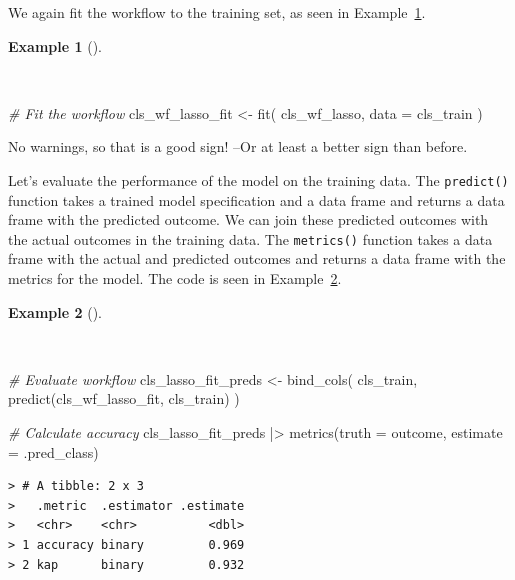 \documentclass[
  letterpaper,
  DIV=11,
  numbers=noendperiod]{scrreprt}
\newenvironment{Shaded}{\begin{snugshade}}{\end{snugshade}}
\newcommand{\AttributeTok}[1]{\textcolor[rgb]{0.00,0.00,0.00}{#1}}
\newcommand{\CommentTok}[1]{\textcolor[rgb]{0.00,0.00,0.00}{\textit{#1}}}
\newcommand{\FunctionTok}[1]{\textcolor[rgb]{0.00,0.00,0.00}{#1}}
\newcommand{\NormalTok}[1]{\textcolor[rgb]{0.00,0.00,0.00}{#1}}
\newcommand{\OtherTok}[1]{\textcolor[rgb]{0.00,0.00,0.00}{#1}}
\newcommand{\SpecialCharTok}[1]{\textcolor[rgb]{0.00,0.00,0.00}{#1}}
\theoremstyle{definition}
\newtheorem{example}{Example}[chapter]
\theoremstyle{remark}
\begin{document}
We again fit the workflow to the training set, as seen in
Example~\ref{exm-pda-class-tune-hyperparameters-fit}.

\begin{example}[]\protect\hypertarget{exm-pda-class-tune-hyperparameters-fit}{}\label{exm-pda-class-tune-hyperparameters-fit}

~

\begin{Shaded}
\begin{Highlighting}[]
\CommentTok{\# Fit the workflow}
\NormalTok{cls\_wf\_lasso\_fit }\OtherTok{\textless{}{-}}
  \FunctionTok{fit}\NormalTok{(}
\NormalTok{    cls\_wf\_lasso,}
    \AttributeTok{data =}\NormalTok{ cls\_train}
\NormalTok{    )}
\end{Highlighting}
\end{Shaded}

\end{example}

No warnings, so that is a good sign! --Or at least a better sign than
before.

Let's evaluate the performance of the model on the training data. The
\texttt{predict()} function takes a trained model specification and a
data frame and returns a data frame with the predicted outcome. We can
join these predicted outcomes with the actual outcomes in the training
data. The \texttt{metrics()} function takes a data frame with the actual
and predicted outcomes and returns a data frame with the metrics for the
model. The code is seen in
Example~\ref{exm-pda-class-tune-hyperparameters-evaluate}.

\begin{example}[]\protect\hypertarget{exm-pda-class-tune-hyperparameters-evaluate}{}\label{exm-pda-class-tune-hyperparameters-evaluate}

~

\begin{Shaded}
\begin{Highlighting}[]
\CommentTok{\# Evaluate workflow}
\NormalTok{cls\_lasso\_fit\_preds }\OtherTok{\textless{}{-}}
  \FunctionTok{bind\_cols}\NormalTok{(}
\NormalTok{    cls\_train,}
    \FunctionTok{predict}\NormalTok{(cls\_wf\_lasso\_fit, cls\_train)}
\NormalTok{  )}

\CommentTok{\# Calculate accuracy}
\NormalTok{cls\_lasso\_fit\_preds }\SpecialCharTok{|\textgreater{}}
  \FunctionTok{metrics}\NormalTok{(}\AttributeTok{truth =}\NormalTok{ outcome, }\AttributeTok{estimate =}\NormalTok{ .pred\_class)}
\end{Highlighting}
\end{Shaded}

\begin{verbatim}
> # A tibble: 2 x 3
>   .metric  .estimator .estimate
>   <chr>    <chr>          <dbl>
> 1 accuracy binary         0.969
> 2 kap      binary         0.932
\end{verbatim}

\end{example}
\end{document}
